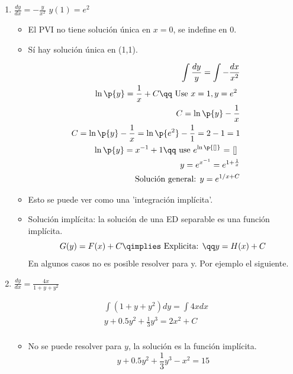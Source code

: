 \begin{enumerate}
    \item $\displaystyle \frac{d y}{d x} = -\frac{y}{x^2}$ $y(1)=e^2$ 
        \begin{itemize}
            \item El PVI no tiene solución única en $x=0$, se indefine en 0.
            \item Sí hay solución única en (1,1).
        \end{itemize}
        \begin{center}
           \begin{align*}
               \int \frac{d y}{y}  = \int -\frac{d x}{x^2} \\ 
               \ln\p{ y } = \frac{1}{x} + C \qq \text{ Use $x=1, y=e^2$  }\\ 
               C = \ln\p{ y } - \frac{1}{x} \\
               C = \ln\p{ y } - \frac{1}{x} = \ln\p{ e^2 } - \frac{1}{1} = 2 -1 = 1 \\ 
               \ln\p{ y } = x^{-1} + 1 \qq \text{ use $e^{\ln\p{ [] }  }$ = [] }   \\ 
               y = e^{x^{-1}} = e^{1+\frac{1}{x}} \\ 
               \text{ Solución general: } y = e^{1/x+C} \\ 
           \end{align*}
        \end{center}
        \begin{itemize}
            \item Esto se puede ver como una 'integración implícita'.
            \item Solución implícita: la solución de una ED separable es una función implícita.
                \[
                  G(y) = F(x)+C \qimplies \text{ Explicita: } \qq y = H(x) + C 
                \]
                En algunos casos no es posible resolver para y. Por ejemplo el siguiente.
        \end{itemize}
    
    \item $\displaystyle \frac{d y}{d x} = \frac{4x}{1+y+y^2}$
        \begin{center}
           \begin{align*}
               \int (1+y+y^2)dy = \int 4xdx \\ 
               y + 0.5y^2 + \frac{1}{3}y^3 = 2x^2 + C \\ 
           \end{align*}
           \begin{itemize}
               \item No se puede resolver para $y$, la solución es la función implícita.
                \[
                  y + 0.5y^2 + \frac{1}{3}y^3  -x^2 = 15 
                \]
           \end{itemize}
        \end{center}
\end{enumerate}

